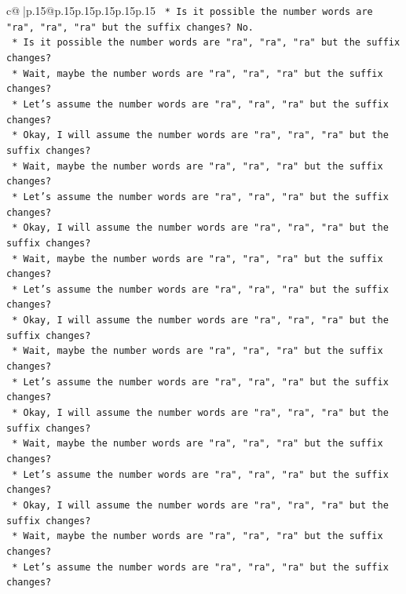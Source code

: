 \documentclass{article}
\begin{document}
{\begin{supertabular}{c@{$\;$}|p{.15\linewidth}@{}p{.15\linewidth}p{.15\linewidth}p{.15\linewidth}p{.15\linewidth}p{.15\linewidth}}
{{{\texttt{    *   Is it possible the number words are "ra", "ra", "ra" but the suffix changes? No.} \\
\texttt{    *   Is it possible the number words are "ra", "ra", "ra" but the suffix changes?} \\
\texttt{    *   Wait, maybe the number words are "ra", "ra", "ra" but the suffix changes?} \\
\texttt{    *   Let's assume the number words are "ra", "ra", "ra" but the suffix changes?} \\
\texttt{    *   Okay, I will assume the number words are "ra", "ra", "ra" but the suffix changes?} \\
\texttt{    *   Wait, maybe the number words are "ra", "ra", "ra" but the suffix changes?} \\
\texttt{    *   Let's assume the number words are "ra", "ra", "ra" but the suffix changes?} \\
\texttt{    *   Okay, I will assume the number words are "ra", "ra", "ra" but the suffix changes?} \\
\texttt{    *   Wait, maybe the number words are "ra", "ra", "ra" but the suffix changes?} \\
\texttt{    *   Let's assume the number words are "ra", "ra", "ra" but the suffix changes?} \\
\texttt{    *   Okay, I will assume the number words are "ra", "ra", "ra" but the suffix changes?} \\
\texttt{    *   Wait, maybe the number words are "ra", "ra", "ra" but the suffix changes?} \\
\texttt{    *   Let's assume the number words are "ra", "ra", "ra" but the suffix changes?} \\
\texttt{    *   Okay, I will assume the number words are "ra", "ra", "ra" but the suffix changes?} \\
\texttt{    *   Wait, maybe the number words are "ra", "ra", "ra" but the suffix changes?} \\
\texttt{    *   Let's assume the number words are "ra", "ra", "ra" but the suffix changes?} \\
\texttt{    *   Okay, I will assume the number words are "ra", "ra", "ra" but the suffix changes?} \\
\texttt{    *   Wait, maybe the number words are "ra", "ra", "ra" but the suffix changes?} \\
\texttt{    *   Let's assume the number words are "ra", "ra", "ra" but the suffix changes?} \\
}}}
\end{supertabular}}
\end{document}
